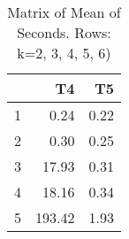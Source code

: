 \begin{table}[ht]
\centering
\begin{tabular}{rrr}
  \hline
 & T4 & T5 \\ 
  \hline
1 & 0.24 & 0.22 \\ 
  2 & 0.30 & 0.25 \\ 
  3 & 17.93 & 0.31 \\ 
  4 & 18.16 & 0.34 \\ 
  5 & 193.42 & 1.93 \\ 
   \hline
\end{tabular}
\caption{Matrix of Mean of Seconds.  Rows: k=2, 3, 4, 5, 6)} 
\end{table}
